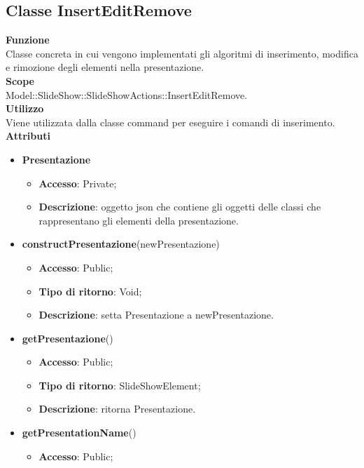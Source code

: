 \subsection{Classe InsertEditRemove}{
		\textbf{Funzione}\\
			\indent Classe concreta in cui vengono implementati gli algoritmi di inserimento, modifica e rimozione degli elementi nella presentazione.\\
	   	\textbf{Scope}\\
			\indent Model::SlideShow::SlideShowActions::InsertEditRemove.\\
		\textbf{Utilizzo}\\
			\indent Viene utilizzata dalla classe command per eseguire i comandi di inserimento.\\
		\textbf{Attributi}
		\begin{itemize}
			\item \textbf{Presentazione}
			\begin{itemize}
				\item \textbf{Accesso}: Private;
				\item \textbf{Descrizione}: oggetto json che contiene gli oggetti delle classi che rappresentano gli elementi della presentazione.
			\end{itemize}
		\end{itemize}
		\begin{itemize}
			\item \textbf{constructPresentazione}(newPresentazione)
			\begin{itemize}
				\item \textbf{Accesso}: Public;
				\item \textbf{Tipo di ritorno}: Void;
				\item \textbf{Descrizione}: setta Presentazione a newPresentazione.
			\end{itemize}
			\item \textbf{getPresentazione}()
			\begin{itemize}
				\item \textbf{Accesso}: Public;
				\item \textbf{Tipo di ritorno}: SlideShowElement;
				\item \textbf{Descrizione}: ritorna Presentazione.
			\end{itemize}
			\item \textbf{getPresentationName}()
			\begin{itemize}
				\item \textbf{Accesso}: Public;

\end{itemize}
\end{itemize}}
